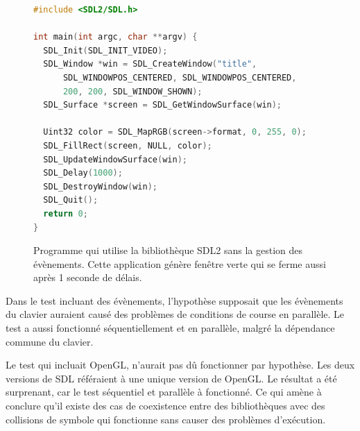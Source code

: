 \begin{center}
  \begin{figure}[ht]
\begin{lstlisting}[language=C,frame=single]
#include <SDL2/SDL.h>

int main(int argc, char **argv) {
  SDL_Init(SDL_INIT_VIDEO);
  SDL_Window *win = SDL_CreateWindow("title",
      SDL_WINDOWPOS_CENTERED, SDL_WINDOWPOS_CENTERED,
      200, 200, SDL_WINDOW_SHOWN);
  SDL_Surface *screen = SDL_GetWindowSurface(win);

  Uint32 color = SDL_MapRGB(screen->format, 0, 255, 0);
  SDL_FillRect(screen, NULL, color);
  SDL_UpdateWindowSurface(win);
  SDL_Delay(1000);
  SDL_DestroyWindow(win);
  SDL_Quit();
  return 0;
}
\end{lstlisting}
    \caption{Programme qui utilise la bibliothèque SDL2 sans la gestion des évènements.
    Cette application génère fenêtre verte qui se ferme aussi après 1 seconde de délais.}
  \end{figure}
\end{center}

Dans le test incluant des évènements, l'hypothèse supposait que les évènements du clavier
auraient causé des problèmes de conditions de course en parallèle. Le test a aussi fonctionné
séquentiellement et en parallèle, malgré la dépendance commune du clavier.

Le test qui incluait OpenGL, n'aurait pas dû fonctionner par hypothèse. Les deux versions
de SDL référaient à une unique version de OpenGL. Le résultat a été surprenant, car le test
séquentiel et parallèle à fonctionné. Ce qui amène à conclure qu'il existe des cas
de coexistence entre des bibliothèques avec des collisions de symbole qui fonctionne
sans causer des problèmes d'exécution.



